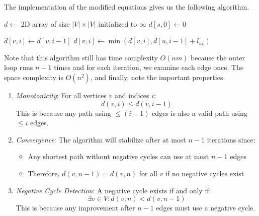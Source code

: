   \begin{algo}
    The implementation of the modified equations gives us the following algorithm. 
    \begin{algorithm}[H]
      \label{alg:bellman_ford_leq}
      \begin{algorithmic}[1]
        \State $d \gets$ 2D array of size $|V| \times |V|$ initialized to $\infty$
        \State $d[s,0] \gets 0$ 
        
            \State $d[v,i] \gets d[v,i-1]$ 
              \State $d[v,i] \gets \min(d[v,i], d[u,i-1] + l_{uv})$
            \EndFor
          \EndFor
        \EndFor
      \end{algorithmic}
    \end{algorithm}
    Note that this algorithm still has time complexity $O(nm)$ because the outer loop runs $n-1$ times and for each iteration, we examine each edge once. The space complexity is $O(n^2)$, and finally, note the important properties. 
    \begin{enumerate}
      \item \textit{Monotonicity}: For all vertices $v$ and indices $i$:
      \begin{equation}
        d(v,i) \leq d(v,i-1)
      \end{equation}
      This is because any path using $\leq (i-1)$ edges is also a valid path using $\leq i$ edges.

      \item \textit{Convergence}: The algorithm will stabilize after at most $n-1$ iterations since:
      \begin{itemize}
        \item Any shortest path without negative cycles can use at most $n-1$ edges
        \item Therefore, $d(v,n-1) = d(v,n)$ for all $v$ if no negative cycles exist
      \end{itemize}

      \item \textit{Negative Cycle Detection}: A negative cycle exists if and only if:
      \begin{equation}
        \exists v \in V : d(v,n) < d(v,n-1)
      \end{equation}
      This is because any improvement after $n-1$ edges must use a negative cycle.
    \end{enumerate}
  \end{algo}

